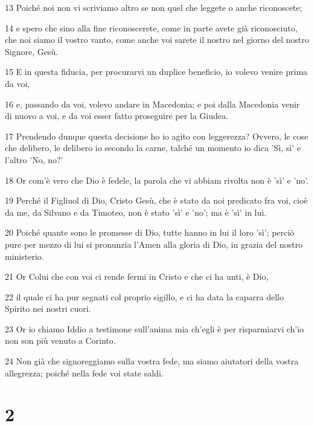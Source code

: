 \par 13 Poiché noi non vi scriviamo altro se non quel che leggete o anche riconoscete;
\par 14 e spero che sino alla fine riconoscerete, come in parte avete già riconosciuto, che noi siamo il vostro vanto, come anche voi sarete il nostro nel giorno del nostro Signore, Gesù.
\par 15 E in questa fiducia, per procurarvi un duplice beneficio, io volevo venire prima da voi,
\par 16 e, passando da voi, volevo andare in Macedonia; e poi dalla Macedonia venir di nuovo a voi, e da voi esser fatto proseguire per la Giudea.
\par 17 Prendendo dunque questa decisione ho io agito con leggerezza? Ovvero, le cose che delibero, le delibero io secondo la carne, talché un momento io dica 'Sì, sì' e l'altro 'No, no?'
\par 18 Or com'è vero che Dio è fedele, la parola che vi abbiam rivolta non è 'sì' e 'no'.
\par 19 Perché il Figliuol di Dio, Cristo Gesù, che è stato da noi predicato fra voi, cioè da me, da Silvano e da Timoteo, non è stato 'sì' e 'no'; ma è 'sì' in lui.
\par 20 Poiché quante sono le promesse di Dio, tutte hanno in lui il loro 'sì'; perciò pure per mezzo di lui si pronunzia l'Amen alla gloria di Dio, in grazia del nostro ministerio.
\par 21 Or Colui che con voi ci rende fermi in Cristo e che ci ha unti, è Dio,
\par 22 il quale ci ha pur segnati col proprio sigillo, e ci ha data la caparra dello Spirito nei nostri cuori.
\par 23 Or io chiamo Iddio a testimone sull'anima mia ch'egli è per risparmiarvi ch'io non son più venuto a Corinto.
\par 24 Non già che signoreggiamo sulla vostra fede, ma siamo aiutatori della vostra allegrezza; poiché nella fede voi state saldi.

\chapter{2}

